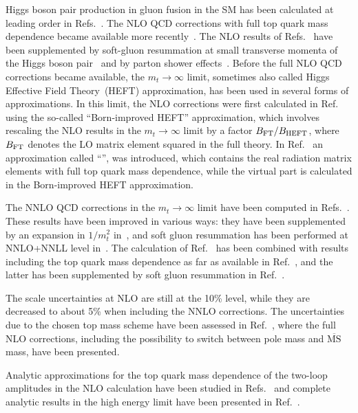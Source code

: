 Higgs boson pair production in gluon fusion in the SM has been calculated at leading order in Refs.~\cite{Eboli:1987dy,Glover:1987nx,Plehn:1996wb}.
The NLO QCD corrections with full top quark mass dependence became available more recently~\cite{Borowka:2016ehy,Borowka:2016ypz,Baglio:2018lrj}.
The NLO results of Refs.~\cite{Borowka:2016ehy,Borowka:2016ypz} have been supplemented by soft-gluon resummation at small transverse momenta of the Higgs boson pair~\cite{Ferrera:2016prr}
and by parton shower effects~\cite{Heinrich:2017kxx,Jones:2017giv}.
Before the full NLO QCD corrections became available, the $m_t\to\infty$ limit, sometimes also called Higgs Effective Field Theory~(HEFT) approximation,
has been used in several forms of approximations. 
In this limit, the NLO corrections were first calculated in 
Ref.~\cite{Dawson:1998py} using the so-called ``Born-improved HEFT'' approximation, 
which involves rescaling the NLO results in the $m_t\to\infty$ limit by a factor $B_{\rm FT}/B_{\rm HEFT}$, where $B_{\rm FT}$
denotes the LO matrix element squared in the full theory.
In Ref.~\cite{Maltoni:2014eza} an approximation called
``\ftapprox'', was introduced, which contains the real radiation matrix elements 
with full top quark mass dependence, while the virtual part is
calculated in the Born-improved HEFT approximation.

The NNLO QCD corrections in the $m_t\to\infty$ limit have been computed in Refs.~\cite{deFlorian:2013uza,deFlorian:2013jea,Grigo:2014jma,deFlorian:2016uhr}. 
These results have been improved in various ways: they have been supplemented by an expansion in $1/m_t^2$ in~\cite{Grigo:2015dia}, and soft gluon resummation has been performed at NNLO+NNLL level in~\cite{deFlorian:2015moa}. 
 The calculation of Ref.~\cite{deFlorian:2016uhr} has been combined with results including the top quark mass dependence as far as available in Ref.~\cite{Grazzini:2018bsd}, and the latter has been supplemented by soft gluon resummation in Ref.~\cite{deFlorian:2018tah}. 

The scale uncertainties at NLO are still at the 10\% level, while they are decreased to about 5\% when including the NNLO corrections.
The uncertainties due to the chosen top mass scheme have been assessed in Ref.~\cite{Baglio:2018lrj}, where the full NLO corrections, including the possibility to switch between pole mass and $\overline{\mathrm{MS}}$ mass, have been presented.

Analytic approximations for the top quark mass dependence of the two-loop amplitudes in the NLO calculation have been studied in Refs.~\cite{Grober:2017uho,Bonciani:2018omm,Xu:2018eos,Davies:2018ood} and complete analytic results in the high energy limit have been presented in Ref.~\cite{Davies:2018qvx}.


